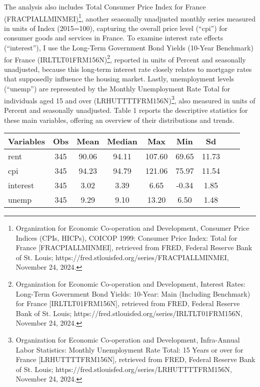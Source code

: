 \documentclass[12pt, times]{article}
\renewcommand{\baselinestretch}{1.5}
\begin{document}
The analysis also includes Total Consumer Price Index for France (FRACPIALLMINMEI)\footnote{Organization for Economic Co-operation and Development, Consumer Price Indices (CPIs, HICPs), COICOP 1999: Consumer Price Index: Total for France [FRACPIALLMINMEI], retrieved from FRED, Federal Reserve Bank of St. Louis; https://fred.stlouisfed.org/series/FRACPIALLMINMEI, November 24, 2024.}, another seasonally unadjusted monthly series measured in units of Index (2015=100), capturing the overall price level (``cpi'') for consumer goods and services in France. To examine interest rate effects (``interest''), I use the Long-Term Government Bond Yields (10-Year Benchmark) for France (IRLTLT01FRM156N)\footnote{Organization for Economic Co-operation and Development, Interest Rates: Long-Term Government Bond Yields: 10-Year: Main (Including Benchmark) for France [IRLTLT01FRM156N], retrieved from FRED, Federal Reserve Bank of St. Louis; https://fred.stlouisfed.org/series/IRLTLT01FRM156N, November 24, 2024.}, reported in units of Percent and seasonally unadjusted, because this long-term interest rate closely relates to mortgage rates that supposedly influence the housing market. Lastly, unemployment levels (``unemp'') are represented by the Monthly Unemployment Rate Total for individuals aged 15 and over (LRHUTTTTFRM156N)\footnote{Organization for Economic Co-operation and Development, Infra-Annual Labor Statistics: Monthly Unemployment Rate Total: 15 Years or over for France [LRHUTTTTFRM156N], retrieved from FRED, Federal Reserve Bank of St. Louis; https://fred.stlouisfed.org/series/LRHUTTTTFRM156N, November 24, 2024.}, also measured in units of Percent and seasonally unadjusted. Table 1 reports the descriptive statistics for these main variables, offering an overview of their distributions and trends.

\renewcommand{\baselinestretch}{1.0}
  \begin{scriptsize}
  \begin{center}
  \tabcolsep 20pt
    \begin{tabular}{lcccccccc}
    \toprule
Variables & Obs & Mean & Median & Max & Min & Sd\\
\midrule
rent      &	345	& 90.06 & 94.11 & 107.60 & 69.65 & 11.73\\
cpi       &	345	& 94.23 & 94.79 & 121.06 & 75.97 & 11.54\\
interest  &	345	& 3.02 & 3.39 & 6.65 & -0.34 & 1.85\\
unemp     &	345	& 9.29 & 9.10 & 13.20 & 6.50 & 1.48\\
\bottomrule													
    \end{tabular}
    \end{center}
  \end{scriptsize}
\end{document}
